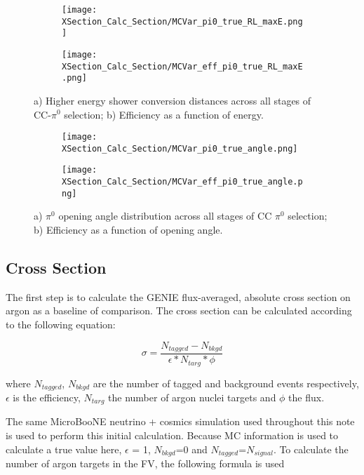 \begin{figure}[H]
  \begin{subfigure}[t]{0.35\textwidth}
\texttt{[image: XSection\_Calc\_Section/MCVar\_pi0\_true\_RL\_maxE.png]}
  \caption{ }
  \end{subfigure} 
  \hspace{15mm}
  \begin{subfigure}[t]{0.35\textwidth}
\texttt{[image: XSection\_Calc\_Section/MCVar\_eff\_pi0\_true\_RL\_maxE.png]}
  \caption{ }
  \end{subfigure} 
\caption{a) Higher energy shower conversion distances across all stages of CC-$\pi^0$ selection; b) Efficiency as a function of energy. }
\label{fig:pi0_effs_5}
\end{figure}


\begin{figure}[H]
  \begin{subfigure}[t]{0.35\textwidth}
\texttt{[image: XSection\_Calc\_Section/MCVar\_pi0\_true\_angle.png]}
  \caption{ }
  \end{subfigure} 
  \hspace{15mm}
  \begin{subfigure}[t]{0.35\textwidth}
\texttt{[image: XSection\_Calc\_Section/MCVar\_eff\_pi0\_true\_angle.png]}
  \caption{ }
  \end{subfigure} 
\caption{a) $\pi^0$ opening angle distribution across all stages of CC $\pi^0$ selection; b) Efficiency as a function of opening angle. }
\label{fig:pi0_effs_6}
\end{figure}


\clearpage
\subsection{Cross Section}

The first step is to calculate the GENIE flux-averaged, absolute cross section on argon as a baseline of comparison.  The cross section can be calculated according to the following equation:

\begin{equation}
  \sigma = \frac{N_{tagged} - N_{bkgd}}{\epsilon*N_{targ}*\phi}
\end{equation}

\noindent where $N_{tagged}$, $N_{bkgd}$ are the number of tagged and background events respectively, $\epsilon$ is the efficiency, $N_{targ}$ the number of argon nuclei targets and $\phi$ the flux. 
\par The same MicroBooNE neutrino + cosmics simulation used throughout this note is used to perform this initial calculation.  Because MC information is used to calculate a true value here, $\epsilon$ = 1, $N_{bkgd}$=0 and $N_{tagged}$=$N_{signal}$. To calculate the number of argon targets in the FV, the following formula is used


